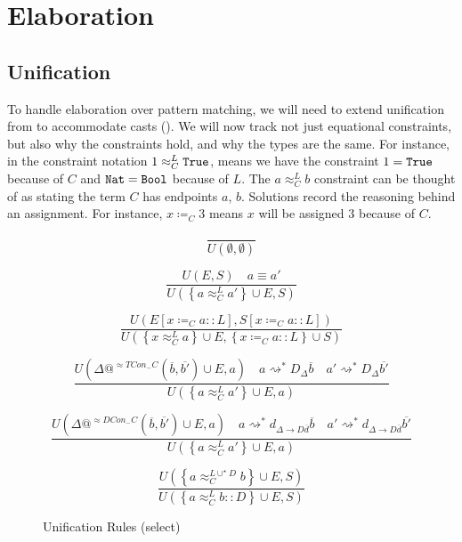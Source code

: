 \section{Elaboration}

\subsection{Unification}

To handle elaboration over pattern matching, we will need to extend unification from  to accommodate casts ().
We will now track not just equational constraints, but also why the constraints hold, and why the types are the same.
For instance, in the constraint notation $1 \approx_{C}^{L} \mathtt{True}{}$, means we have the constraint $1 = \mathtt{True}{}$ because of $C$ and $\mathtt{Nat}{} = \mathtt{Bool}{}$ because of $L$.
The $a \approx_{C}^{L} b$ constraint can be thought of as stating the term $C$ has endpoints $a$, $b$.
Solutions record the reasoning behind an assignment.
For instance, $x\coloneqq_{C} 3$ means $x$ will be assigned $3$ because of $C$.

\begin{figure}
\[
\frac{\,}{U\left(\emptyset,\emptyset\right)}
\]

\[
\frac{
  U\left(E,S\right)\quad a\equiv a'
}{
  U\left(\left\{ a \approx_{C}^{L} a' \right\} \cup E,S\right)
}
\]

\[
\frac{
  U\left(E\left[x\coloneqq_{C} a :: L\right],S\left[x\coloneqq_{C} a :: L\right]\right)
}{
  U\left(\left\{ x \approx_{C}^{L} a\right\} \cup E,\left\{x\coloneqq_{C} a :: L\right\} \cup S \right) 
}
\]

\[
\frac{
  U\left(\Delta @^{\approx TCon_{-}C}( \overline{b},\overline{b'} ) \cup E,a\right)\quad
  a\rightsquigarrow^* D_{\Delta}\overline{b}
  \quad   a' \rightsquigarrow^* D_{\Delta}\overline{b'}
}{U\left(\left\{ a \approx_{C}^{L} a'\right\} \cup E,a\right)}
\]

\[
\frac{
  U\left(\Delta @^{\approx DCon_{-}C}( \overline{b},\overline{b'} ) \cup E,a\right)\quad
  a\rightsquigarrow^* d_{\Delta\rightarrow D\overline{d}}\overline{b}
  \quad   a' \rightsquigarrow^* d_{\Delta\rightarrow D\overline{d}}\overline{b'}
}{U\left(\left\{ a \approx_{C}^{L} a'\right\} \cup E,a\right)}
\]

\[
\frac{
  U\left( \left\{ a \approx_{C}^{L\cup^{\star}D} b \right\}\cup E, S \right)
}{
  U\left(\left\{ a \approx_{C}^{L} b::D \right\} \cup E, S \right) 
}
\]

\caption{\CLang{} Unification Rules (select)}
\label{fig:cast-data-unification}
\end{figure}

